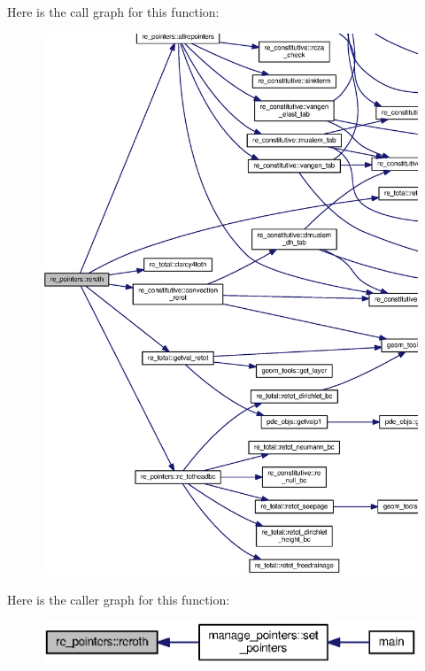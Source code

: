 Here is the call graph for this function\+:\nopagebreak
\begin{figure}[H]
\begin{center}
\leavevmode
\includegraphics[width=350pt]{namespacere__pointers_a2ae8b49e9d185cc91057283c869cb633_cgraph}
\end{center}
\end{figure}




Here is the caller graph for this function\+:\nopagebreak
\begin{figure}[H]
\begin{center}
\leavevmode
\includegraphics[width=350pt]{namespacere__pointers_a2ae8b49e9d185cc91057283c869cb633_icgraph}
\end{center}
\end{figure}


